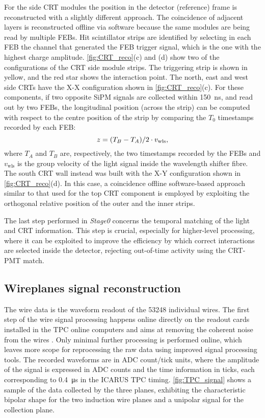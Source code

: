 For the side CRT modules the position in the detector (reference) frame is reconstructed with a slightly different approach. The coincidence of adjacent layers is reconstructed offline via software because the same modules are being read by multiple FEBs. Hit scintillator strips are identified by selecting in each FEB the channel that generated the FEB trigger signal, which is the one with the highest charge amplitude. \autoref{fig:CRT_reco}(c) and (d) show two of the configurations of the CRT side module strips. The triggering strip is shown in yellow, and the red star shows the interaction point. The north, east and west side CRTs have the X-X configuration shown in \autoref{fig:CRT_reco}(c). For these components, if two opposite SiPM signals are collected within \SI{150}{\ns}, and read out by two FEBs, the longitudinal position (across the strip) can be computed with respect to the centre position of the strip by comparing the $T_0$ timestamps recorded by each FEB:     \begin{equation}
    z = \qty(T_B - T_A)/2 \cdot v_\mathrm{wls}, 
\end{equation} where $T_A$ and $T_B$ are, respectively, the two timestamps recorded by the FEBs  and $v_\mathrm{wls}$ is the group velocity of the light signal inside the wavelength shifter fibre. The south CRT wall instead was built with the X-Y configuration shown in \autoref{fig:CRT_reco}(d). In this case, a coincidence offline software-based approach similar to that used for the top CRT component is employed by exploiting the orthogonal relative position of the outer and the inner strips. 

The last step performed in \emph{Stage0} concerns the temporal matching of the light and CRT information. This step is crucial, especially for higher-level processing, where it can be exploited to improve the efficiency by which correct interactions are selected inside the detector, rejecting out-of-time activity using the CRT-PMT match. 

\subsection{Wireplanes signal reconstruction} \label{sec:TPCSignalReconstruction}

The wire data is the waveform readout of the \num{53248} individual wires. The first step of the wire signal processing happens online directly on the readout cards installed in the TPC online computers and aims at removing the coherent noise from the wires \cite{MicroBooNE:2017qiu}. Only minimal further processing is performed online, which leaves more scope for reprocessing the raw data using improved signal processing tools. The recorded waveforms are in ADC count/tick units, where the amplitude of the signal is expressed in ADC counts and the time information in ticks, each corresponding to \SI{0.4}{\us} in the ICARUS TPC timing. \autoref{fig:TPC_signal} shows a sample of the data collected by the three planes, exhibiting the characteristic bipolar shape for the two induction wire planes and a unipolar signal for the collection plane. 

